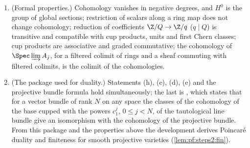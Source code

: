 \begin{proposition}
\begin{enumerate}[label=\textup{(\alph*)},leftmargin=2.2em]
  section of $\mathbb G_m$ has $q$-th roots locally; its boundary maps $H^n(-,\mathbb G_m)\to
  H^{n+1}(-,\Z/q(1))$ are natural, fit into the long exact sequence, and agree up to a sign with the
  Kummer class of units ($n=0$) and the first Chern class of line bundles ($n=1$)
  \cite[Ch.~II, 2.18(b); Ch.~III, \S4]{Milne1980}. If the Kummer class of a unit $w$ vanishes, $w$ is a $q$-th power of
  a unit. If $q\in A^\times$, every unit of $A$ is a $q$-th power and $\Pic(A)$ has no $q$-torsion,
  then $H^1(\Spec A,\Z/q(1))=0$.
\item (Formal properties.) Cohomology vanishes in negative degrees, and $H^0$ is the group of global
  sections; restriction of scalars along a ring map does not change cohomology; reduction of
  coefficients $\Z/Q\to\Z/q$ ($q\mid Q$) is transitive and compatible with cup products, units and
  first Chern classes; cup products are associative and graded commutative; the cohomology of
  $\Spec\varinjlim A_j$, for a filtered colimit of rings and a sheaf commuting with filtered colimits,
  is the colimit of the cohomologies.
\item (The package used for duality.) Statements (h), (c), (d), (e) and the projective bundle formula
  hold simultaneously; the last is ,
  which states that for a vector bundle of rank $N$ on any space the classes of the cohomology of the
  base cupped with the powers $c_1^j$, $0\le j<N$, of the tautological line bundle give an
  isomorphism with the cohomology of the projective bundle. From this package and the properties
  above the development derives Poincar\'e duality and finiteness for smooth projective varieties
  (\cref{lem:pf:steps2:fin}).
\end{enumerate}

\end{proposition}
